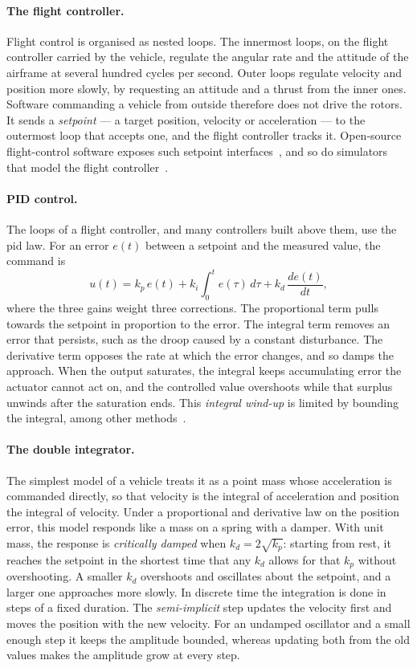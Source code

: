 \paragraph{The flight controller.} Flight control is organised as nested loops. The innermost loops,
on the flight controller carried by the vehicle, regulate the angular rate and the attitude of the
airframe at several hundred cycles per second. Outer loops regulate velocity and position more
slowly, by requesting an attitude and a thrust from the inner ones. Software commanding a vehicle
from outside therefore does not drive the rotors. It sends a \emph{setpoint} --- a target position,
velocity or acceleration --- to the outermost loop that accepts one, and the flight controller
tracks it. Open-source flight-control software exposes such setpoint interfaces~\cite{px4userguide}, and so do
simulators that model the flight controller~\cite{pyflyt}.

\paragraph{PID control.} The loops of a flight controller, and many controllers built above them,
use the \gls{pid} law. For an error $e(t)$ between a setpoint and the measured value, the command is
\begin{equation}
  \label{eq:pid}
  u(t) = k_p\, e(t) + k_i \int_0^t e(\tau)\, d\tau + k_d\, \frac{de(t)}{dt},
\end{equation}
where the three gains weight three corrections. The proportional term pulls towards the setpoint in
proportion to the error. The integral term removes an error that persists, such as the droop
caused by a constant disturbance. The derivative term opposes the rate at which the error changes,
and so damps the approach. When the output saturates, the integral keeps accumulating error the
actuator cannot act on, and the controlled value overshoots while that surplus unwinds after the
saturation ends. This \emph{integral wind-up} is limited by bounding the integral, among other
methods~\cite{astrom2008}.

\paragraph{The double integrator.} The simplest model of a vehicle treats it as a point mass whose
acceleration is commanded directly, so that velocity is the integral of acceleration and position
the integral of velocity. Under a proportional and derivative law on the position error, this model
responds like a mass on a spring with a damper. With unit mass, the response is \emph{critically
damped} when $k_d = 2\sqrt{k_p}$: starting from rest, it reaches the setpoint in the shortest time
that any $k_d$ allows for that $k_p$ without overshooting. A smaller $k_d$ overshoots and oscillates
about the setpoint, and a larger one approaches more slowly. In discrete time the integration is
done in steps of a fixed duration. The \emph{semi-implicit} step updates the velocity first and
moves the position with the new velocity. For an undamped oscillator and a small enough step it
keeps the amplitude bounded, whereas updating both from the old values makes the amplitude grow at
every step.

